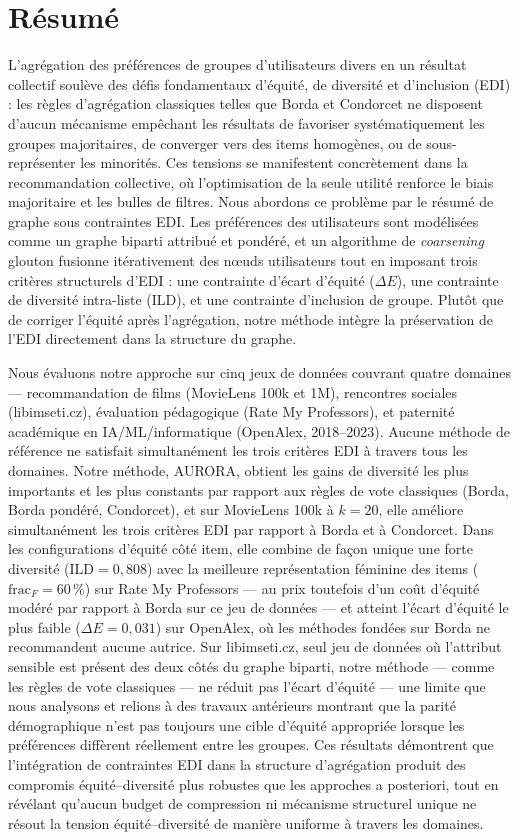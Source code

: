 \documentclass[12pt]{report}
\begin{document}
\section*{Résumé}

L'agrégation des préférences de groupes d'utilisateurs divers en un résultat
collectif soulève des défis fondamentaux d'équité, de diversité et
d'inclusion (EDI) : les règles d'agrégation classiques telles que Borda et
Condorcet ne disposent d'aucun mécanisme empêchant les résultats de
favoriser systématiquement les groupes majoritaires, de converger vers des
items homogènes, ou de sous-représenter les minorités. Ces tensions se
manifestent concrètement dans la recommandation collective, où
l'optimisation de la seule utilité renforce le biais majoritaire et les
bulles de filtres. Nous abordons ce problème par le résumé de graphe sous
contraintes EDI. Les préférences des utilisateurs sont modélisées comme un
graphe biparti attribué et pondéré, et un algorithme de \emph{coarsening}
glouton fusionne itérativement des nœuds utilisateurs tout en imposant
trois critères structurels d'EDI : une contrainte d'écart d'équité
($\Delta E$), une contrainte de diversité intra-liste (ILD), et une
contrainte d'inclusion de groupe. Plutôt que de corriger l'équité après
l'agrégation, notre méthode intègre la préservation de l'EDI directement
dans la structure du graphe.

Nous évaluons notre approche sur cinq jeux de données couvrant quatre
domaines --- recommandation de films (MovieLens 100k et 1M), rencontres
sociales (libimseti.cz), évaluation pédagogique (Rate My Professors), et
paternité académique en IA/ML/informatique (OpenAlex, 2018--2023). Aucune
méthode de référence ne satisfait simultanément les trois critères EDI à
travers tous les domaines. Notre méthode, AURORA, obtient les gains de
diversité les plus importants et les plus constants par rapport aux règles
de vote classiques (Borda, Borda pondéré, Condorcet), et sur MovieLens
100k à $k=20$, elle améliore simultanément les trois critères EDI par
rapport à Borda et à Condorcet. Dans les configurations d'équité côté
item, elle combine de façon unique une forte diversité (ILD$=0{,}808$)
avec la meilleure représentation féminine des items
($\mathrm{frac}_F=60\,\%$) sur Rate My Professors --- au prix toutefois
d'un coût d'équité modéré par rapport à Borda sur ce jeu de données --- et
atteint l'écart d'équité le plus faible ($\Delta E=0{,}031$) sur OpenAlex,
où les méthodes fondées sur Borda ne recommandent aucune autrice. Sur
libimseti.cz, seul jeu de données où l'attribut sensible est présent des
deux côtés du graphe biparti, notre méthode --- comme les règles de vote
classiques --- ne réduit pas l'écart d'équité
--- une limite que nous analysons et relions à des travaux antérieurs
montrant que la parité démographique n'est pas toujours une cible
d'équité appropriée lorsque les préférences diffèrent réellement entre
les groupes. Ces résultats démontrent que l'intégration de contraintes
EDI dans la structure d'agrégation produit des compromis
équité--diversité plus robustes que les approches a posteriori, tout en
révélant qu'aucun budget de compression ni mécanisme structurel unique ne
résout la tension équité--diversité de manière uniforme à travers les
domaines.
\end{document}

